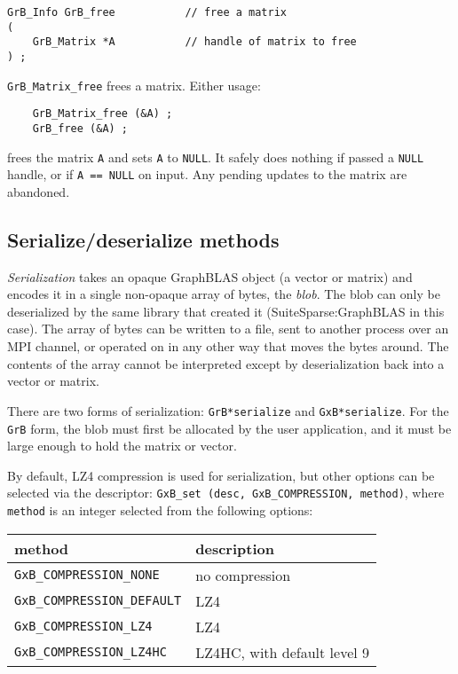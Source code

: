 \documentclass[12pt]{article}
\begin{document}
\begin{mdframed}[userdefinedwidth=6in]
{\footnotesize
\begin{verbatim}
GrB_Info GrB_free           // free a matrix
(
    GrB_Matrix *A           // handle of matrix to free
) ;
\end{verbatim} } \end{mdframed}

\verb'GrB_Matrix_free' frees a matrix.  Either usage:

    {\small
    \begin{verbatim}
    GrB_Matrix_free (&A) ;
    GrB_free (&A) ; \end{verbatim}}

\noindent
frees the matrix \verb'A' and sets \verb'A' to \verb'NULL'.  It safely does
nothing if passed a \verb'NULL' handle, or if \verb'A == NULL' on input.  Any
pending updates to the matrix are abandoned.

\newpage
\subsection{Serialize/deserialize methods}
\label{serialize_deserialize}

{\em Serialization} takes an opaque GraphBLAS object (a vector or matrix) and
encodes it in a single non-opaque array of bytes, the {\em blob}.  The blob can
only be deserialized by the same library that created it (SuiteSparse:GraphBLAS
in this case).  The array of bytes can be written to a file, sent to another
process over an MPI channel, or operated on in any other way that moves the
bytes around.  The contents of the array cannot be interpreted except by
deserialization back into a vector or matrix.

There are two forms of serialization: \verb'GrB*serialize' and
\verb'GxB*serialize'.  For the \verb'GrB' form, the blob must first be
allocated by the user application, and it must be large enough to hold the
matrix or vector.

By default, LZ4 compression is used for serialization, but other options can be
selected via the descriptor: \verb'GxB_set (desc, GxB_COMPRESSION, method)',
where \verb'method' is an integer selected from the following options:

\vspace{0.2in}
{\footnotesize
\begin{tabular}{ll}
method                           &  description \\
\hline
\verb'GxB_COMPRESSION_NONE'      &  no compression \\
\verb'GxB_COMPRESSION_DEFAULT'   &  LZ4 \\
\verb'GxB_COMPRESSION_LZ4'       &  LZ4 \\
\verb'GxB_COMPRESSION_LZ4HC'     &  LZ4HC, with default level 9 \\
\hline
\end{tabular} }
\vspace{0.2in}
\end{document}
